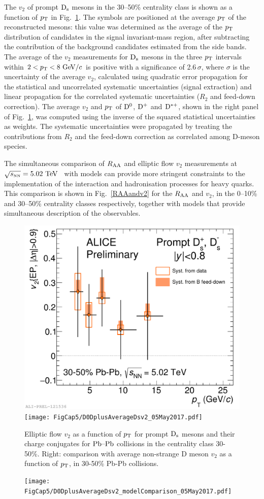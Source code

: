 The $v_2$ of prompt ${\rm D_s}$ mesons in
the 30--50\% centrality class is shown as a function of $p_{\rm T}$ in Fig.~\ref{fig:v2_Ds}.
The symbols are positioned at the average $p_{\rm T}$ of the 
reconstructed mesons: this value was determined as the 
average of the $p_{\rm T}$ distribution of candidates in the signal invariant-mass region, 
after subtracting the contribution of the background 
candidates estimated from the side bands.
The average of the $v_2$ measurements for ${\rm D_s}$ mesons in
 the three $p_{\rm T}$ intervals within $2<p_{\rm T}<8~\mathrm{GeV}/c$ is 
 positive with a significance of 2.6\,$\sigma$,
where $\sigma$ is the uncertainty of the average $v_2$, 
calculated using quadratic error propagation for the
 statistical and uncorrelated systematic uncertainties 
(signal extraction) and linear propagation for the correlated 
systematic uncertainties ($R_2$ and feed-down correction).
The average $v_2$ and $p_{\rm T}$ of ${\rm D^0}$, ${\rm D^+}$ and 
${\rm D^{*+}}$, shown in the right panel of Fig.~\ref{fig:v2_Ds}, was 
computed using the inverse of the squared statistical uncertainties as weights. 
The systematic uncertainties were propagated by
treating the contributions from $R_2$
and the feed-down correction as correlated among D-meson species. 


The simultaneous comparison of $R_{\rm AA}$ and elliptic flow 
$v_2$ measurements at $\sqrt{s_{\rm \scriptscriptstyle NN}}=5.02~\mathrm{TeV}$~\cite{Acharya:2017qps} 
with models can provide more stringent constraints to the 
implementation of the interaction and hadronisation processes for heavy quarks. 
This comparison is shown in Fig.~\ref{RAAandv2} for the $R_{\rm AA}$  
and $v_2$, in the 0--10\% and 30--50\% centrality classes
 respectively, together with models that provide 
 simultaneous description of the observables.
\begin{figure}[!t]
\begin{center}
\includegraphics[width=.49\textwidth]{FigCap5/Dsv2_3050.pdf}
\texttt{[image: FigCap5/D0DplusAverageDsv2\_05May2017.pdf]}
\caption{Elliptic flow $v_2$ as a function of $p_{\rm T}$ for prompt ${\rm D_s}$ mesons 
and their charge conjugates for $\mbox{Pb--Pb}$ collisions in the centrality class 30-50\%.
Right: comparison with average non-strange D meson $v_2$ as a function 
of $p_{\rm T}$, in 30-50\% Pb-Pb collisions. }
\label{fig:v2_Ds} 
\end{center}
\end{figure}

\begin{figure}[!t]
\begin{center}
\texttt{[image: FigCap5/D0DplusAverageDsv2\_modelComparison\_05May2017.pdf]}
\caption{}
\label{fig:v2_models} 
\end{center}
\end{figure}


